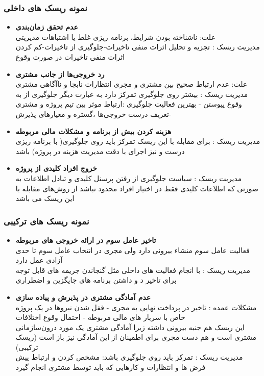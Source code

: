 \documentclass[xcolor=dvipsnames,professionalfonts]{beamer}
\begin{document}
\begin{frame}
	\frametitle{نمونه ریسک های داخلی}

	\begin{itemize}
		\item\textbf{عدم تحقق زمان‌بندی} \\
		علت: ناشناخته بودن شرایط، برنامه ریزی غلط یا اشتباهات مدیریتی \\
		مدیریت ریسک  : تجزیه و تحلیل اثرات منفی تاخیرات-جلوگیری از تاخیرات-کم کردن اثرات منفی تاخیرات در صورت وقوع
		
		\item\textbf{رد خروجی‌ها از جانب مشتری} \\
		علت: عدم ارتباط صحیح بین مشتری و مجری انتظارات نابجا و ناآگاهی مشتری 
		\\مدیریت ریسک : بیشتر روی جلوگیری تمرکز دارد به عبارت دیگر جلوگیری از به وقوع پیوستن -	بهترین فعالیت جلوگیری :ارتباط موثر بین تیم پروژه و مشتری -تعریف درست خروجی‌ها ،گستره و معیارهای پذیرش 
		
		\item\textbf{هزینه کردن بیش از برنامه و مشکلات مالی مربوطه}\\ 
		
		مدیریت ریسک : برای مقابله با این ریسک تمرکز باید روی جلوگیری( با برنامه ریزی درست و نیز اجرای با دقت مدیریت هزینه در پروژه) باشد
		
		\item\textbf{خروج افراد کلیدی از پروژه  } \\
	مدیریت ریسک : سیاست جلوگیری از رفتن پرسنل کلیدی و تبادل اطلاعات به صورتی که اطلاعات کلیدی فقط در اختیار افراد محدود نباشد از روش‌های مقابله با این ریسک می باشد
		
	\end{itemize}
\end{frame}
\begin{frame}
	\frametitle{نمونه ریسک های ترکیبی}
	 
	
	
	
	\begin{itemize}
		\item\textbf{تاخیر عامل سوم در ارائه خروجی های مربوطه} \\
		فعالیت عامل سوم منشاء بیرونی دارد ولی مجری در انتخاب عامل سوم تا حدی آزادی عمل دارد 
		\\مدیریت ریسک : با انجام  فعالیت های داخلی مثل گنجاندن جریمه های قابل توجه برای تاخیر د و داشتن برنامه های جایگزین و اضطراری\\
		\item\textbf{عدم آمادگی مشتری در پذیرش و پیاده سازی } \\
		
		 مشکلات عمده : تاخیر در پرداخت نهایی به مجری - قفل شدن نیروها در یک پروژه خاص با سربار های مالی مربوطه - احتمال وقوع اختلافات\\
		این ریسک هم جنبه بیرونی داشته زیرا آمادگی مشتری یک مورد درون‌سازمانی مشتری است و هم دست مجری برای اطمینان از این آمادگی نیز باز است (ریسک ترکیبی)\\
		مدیریت ریسک : تمرکز باید روی جلوگیری باشد: مشخص کردن و ارتباط پیش فرض ها و انتظارات و کارهایی که باید توسط مشتری انجام گیرد 
	\end{itemize}
\end{frame}
\end{document}
